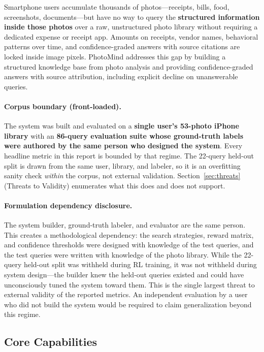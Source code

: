 \documentclass[11pt,letterpaper]{article}
\begin{document}
Smartphone users accumulate thousands of photos---receipts, bills, food, screenshots, documents---but have no way to query the \textbf{structured information inside those photos} over a raw, unstructured photo library without requiring a dedicated expense or receipt app. Amounts on receipts, vendor names, behavioral patterns over time, and confidence-graded answers with source citations are locked inside image pixels. PhotoMind addresses this gap by building a structured knowledge base from photo analysis and providing confidence-graded answers with source attribution, including explicit decline on unanswerable queries.

\paragraph{Corpus boundary (front-loaded).} The system was built and evaluated on a \textbf{single user's 53-photo iPhone library} with an \textbf{86-query evaluation suite whose ground-truth labels were authored by the same person who designed the system}. Every headline metric in this report is bounded by that regime. The 22-query held-out split is drawn from the same user, library, and labeler, so it is an overfitting sanity check \textit{within} the corpus, not external validation. Section~\ref{sec:threats} (Threats to Validity) enumerates what this does and does not support.

\paragraph{Formulation dependency disclosure.} The system builder, ground-truth labeler, and evaluator are the same person. This creates a methodological dependency: the search strategies, reward matrix, and confidence thresholds were designed with knowledge of the test queries, and the test queries were written with knowledge of the photo library. While the 22-query held-out split was withheld during RL training, it was not withheld during system design---the builder knew the held-out queries existed and could have unconsciously tuned the system toward them. This is the single largest threat to external validity of the reported metrics. An independent evaluation by a user who did not build the system would be required to claim generalization beyond this regime.

\subsection{Core Capabilities}
\end{document}
